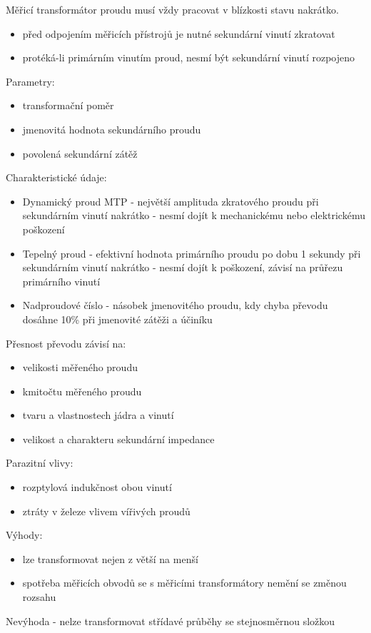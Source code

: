 Měřicí transformátor proudu musí vždy pracovat v blízkosti stavu nakrátko.
\begin{itemize}
    \item před odpojením měřicích přístrojů je nutné sekundární vinutí zkratovat
    \item protéká-li primárním vinutím proud, nesmí být sekundární vinutí rozpojeno
\end{itemize}

Parametry:
\begin{itemize}
    \item transformační poměr
    \item jmenovitá hodnota sekundárního proudu
    \item povolená sekundární zátěž
\end{itemize}
Charakteristické údaje:
\begin{itemize}
    \item Dynamický proud MTP - největší amplituda zkratového proudu při sekundárním
          vinutí nakrátko - nesmí dojít k mechanickému nebo elektrickému poškození
    \item Tepelný proud - efektivní hodnota primárního proudu po dobu 1 sekundy při
          sekundárním vinutí nakrátko - nesmí dojít k poškození, závisí na průřezu
          primárního vinutí
    \item Nadproudové číslo - násobek jmenovitého proudu, kdy chyba převodu dosáhne 10\%
          při jmenovité zátěži a účiníku
\end{itemize}
Přesnost převodu závisí na:
\begin{itemize}
    \item velikosti měřeného proudu
    \item kmitočtu měřeného proudu
    \item tvaru a vlastnostech jádra a vinutí
    \item velikost a charakteru sekundární impedance
\end{itemize}
Parazitní vlivy:
\begin{itemize}
    \item rozptylová indukčnost obou vinutí
    \item ztráty v železe vlivem vířivých proudů
\end{itemize}
\newpage
Výhody:
\begin{itemize}
    \item lze transformovat nejen z větší na menší
    \item spotřeba měřicích obvodů se s měřicími transformátory nemění se změnou rozsahu
\end{itemize}
Nevýhoda - nelze transformovat střídavé průběhy se stejnosměrnou složkou

